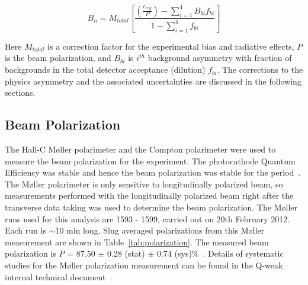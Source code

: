 
\begin{equation} \label{equ:PhysicsAsymmetryShort}
B_{n} = M_{total} \left[ \frac{\left(\frac{\epsilon_{reg}}{P}\right) - \sum^{4}_{i=1} B_{bi}f_{bi} }{ 1 -\sum^{4}_{i=1} f_{bi} } \right]
\end{equation}

Here $M_{total}$ is a correction factor for the experimental bias and radiative effects, $P$ is the beam polarization, and $B_{bi}$ is $i^{th}$ background asymmetry with fraction of backgrounds in the total detector acceptance (dilution) $f_{bi}$. The corrections to the physics asymmetry and the associated uncertainties are discussed in the following sections.


\subsection{Beam Polarization}
\label{Beam Polarization}
The Hall-C M{\o}ller polarimeter and the Compton polarimeter were used to measure the beam polarization for the experiment. 
The photocathode Quantum Efficiency was stable and hence the beam polarization was stable for the period~\cite{magee_communication}. 
The M{\o}ller polarimeter is only sensitive to longitudinally polarized beam, so measurements performed with the longitudinally polarized beam right after the transverse data taking was used to determine the beam polarization. 
The M{\o}ller runs used for this analysis are 1593 - 1599, carried out on 20th February 2012. Each run is $\sim$10 min long. Slug averaged polarizations from this M{\o}ller measurement are shown in Table~\ref{tab:polarization}. The measured beam polarization is $P$ = 87.50 $\pm$ 0.28 (stat) $\pm$ 0.74 (sys)\%~\cite{elog:nur_ancillary91}. Details of systematic studies for the M{\o}ller polarization measurement can be found in the Q-weak internal technical document~\cite{magee_moller}.

